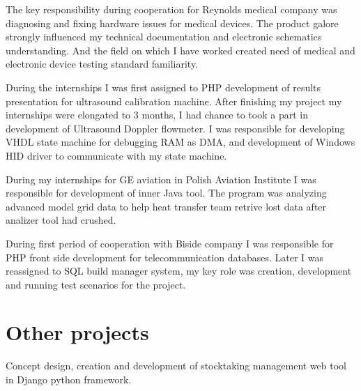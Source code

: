 \documentclass[8pt,a4paper]{moderncv}
\begin{document}
\vspace{4mm}
\cvline{}{}
The key responsibility during cooperation for Reynolds medical company was diagnosing and fixing hardware issues for medical devices.
The product galore strongly influenced my technical documentation and electronic schematics understanding. And the field on which
I have worked created need of medical and electronic device testing standard familiarity.
\cvline{}{}

\vspace{4mm}
\cvline{}{}
During the internships I was first assigned to PHP development of results presentation for ultrasound calibration machine.
After finishing my project my internships were elongated to 3 months, I had chance to took a part in development of Ultrasound
Doppler flowmeter. I was responsible for developing VHDL state machine for debugging RAM as DMA, and development of Windows HID driver
to communicate with my state machine.
\cvline{}{}

\vspace{4mm}
\cvline{}{}
During my internships for GE aviation in Polish Aviation Institute I was responsible for development of inner Java tool.
The program was analyzing advanced model grid data to help heat transfer team retrive lost data after analizer tool had crushed.
\cvline{}{}

\vspace{4mm}
\cvline{}{}
During first period of cooperation with Biside company I was responsible for PHP front side development for telecommunication databases.
Later I was reassigned to SQL build manager system, my key role was creation, development and running test scenarios for the project.
\cvline{}{}

\section{Other projects}
\vspace{4mm}
\cvline{}{}
Concept design, creation and development of stocktaking management web tool in Django python framework.
\cvline{}{}
\end{document}
